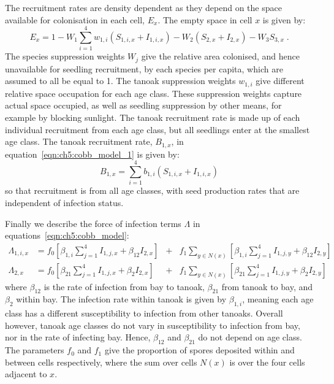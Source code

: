 The recruitment rates are density dependent as they depend on the space available for colonisation in each cell, $E_x$. The empty space in cell $x$ is given by:
\begin{equation}
    E_x = 1 - W_1\sum_{i=1}^4w_{1,i}\left(S_{1,i,x} + I_{1,i,x}\right) - W_2\left(S_{2,x} + I_{2,x}\right) - W_3S_{3,x} \;.
\end{equation}
The species suppression weights $W_j$ give the relative area colonised, and hence unavailable for seedling recruitment, by each species per capita, which are assumed to all be equal to 1. The tanoak suppression weights $w_{1,i}$ give different relative space occupation for each age class. These suppression weights capture actual space occupied, as well as seedling suppression by other means, for example by blocking sunlight. The tanoak recruitment rate is made up of each individual recruitment from each age class, but all seedlings enter at the smallest age class. The tanoak recruitment rate, $B_{1,x}$, in equation~\ref{eqn:ch5:cobb_model_1} is given by:
\begin{equation}
    B_{1,x} = \sum_{i=1}^4b_{1,i}\left(S_{1,i,x} + I_{1,i,x}\right)
\end{equation}
so that recruitment is from all age classes, with seed production rates that are independent of infection status.

Finally we describe the force of infection terms $\Lambda$ in equations~\ref{eqn:ch5:cobb_model}:
\begin{subequations}\label{eqn:ch5:infection}
    \begin{alignat}{5}
        \Lambda_{1,i,x} &= f_0\left[\beta_{1,i}\sum_{j=1}^4I_{1,j,x} + \beta_{12}I_{2,x}\right] &+& f_1\sum_{y\in N(x)}\left[\beta_{1,i}\sum_{j=1}^4I_{1,j,y} + \beta_{12}I_{2,y}\right] \label{eqn:ch5:infection_1}\\
        \Lambda_{2,x} &= f_0\left[\beta_{21}\sum_{j=1}^4I_{1,j,x} + \beta_{2}I_{2,x}\right] &+& f_1\sum_{y\in N(x)}\left[\beta_{21}\sum_{j=1}^4I_{1,j,y} + \beta_{2}I_{2,y}\right] \label{eqn:ch5:infection_2}
    \end{alignat}
\end{subequations}
where $\beta_{12}$ is the rate of infection from bay to tanoak, $\beta_{21}$ from tanoak to bay, and $\beta_{2}$ within bay. The infection rate within tanoak is given by $\beta_{1,i}$, meaning each age class has a different susceptibility to infection from other tanoaks. Overall however, tanoak age classes do not vary in susceptibility to infection from bay, nor in the rate of infecting bay. Hence, $\beta_{12}$ and $\beta_{21}$ do not depend on age class. The parameters $f_0$ and $f_1$ give the proportion of spores deposited within and between cells respectively, where the sum over cells $N(x)$ is over the four cells adjacent to $x$.


